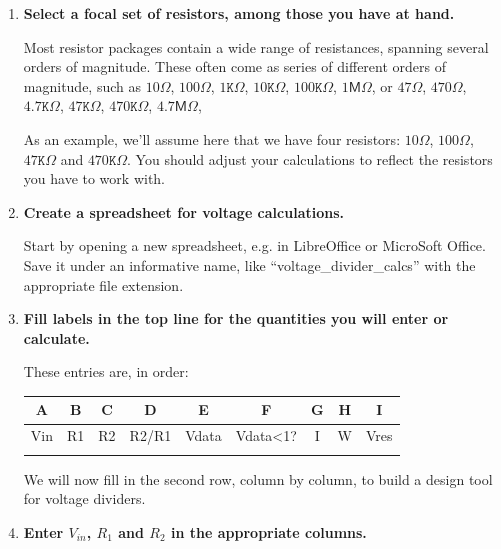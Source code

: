 \begin{enumerate}
	\item \textbf{Select a focal set of resistors, among those you have at hand.}
	
	Most resistor packages contain a wide range of resistances, spanning several orders of magnitude. 
	These often come as series of different orders of magnitude, such as $10 \Omega$, $100 \Omega$, $1\mathtt{K} \Omega$, $10\mathtt{K} \Omega$, $100\mathtt{K} \Omega$, $1 \mathsf{M} \Omega$, or $47 \Omega$, $470 \Omega$, $4.7\mathtt{K} \Omega$, $47\mathtt{K} \Omega$, $470\mathtt{K} \Omega$, $4.7 \mathsf{M} \Omega$, \etc
	
	\smallskip
	As an example, we'll assume here that we have four resistors: $10 \Omega$, $100 \Omega$, $47\mathtt{K} \Omega$ and $470\mathtt{K} \Omega$. 
	You should adjust your calculations to reflect the resistors you have to work with.
	
	\item \textbf{Create a spreadsheet for voltage calculations.}
	
	Start by opening a new spreadsheet, e.g. in LibreOffice or MicroSoft Office. 
	Save it under an informative name, like ``voltage\_divider\_calcs'' with the appropriate file extension.
	
	\item \textbf{Fill labels in the top line for the quantities you will enter or calculate.}
	
	These entries are, in order:
	\begin{table}[H]
	\centering \begin{small}
	\begin{tabular}{|c|c|c|c|c|c|c|c|c|}
		\hline 
		\textbf{A}  & \textbf{B} & \textbf{C} & \textbf{D} & \textbf{E} & \textbf{F} & \textbf{G} & \textbf{H} & \textbf{I} \\ 
		\hline 
		Vin  & R1 & R2 & R2/R1 & Vdata & Vdata<1? & I & W & Vres \\ 
		\hline 
		&  &  &  &  &  &  &  &  \\ 
		\hline 
	\end{tabular} 
	\end{small}
	\end{table}
	We will now fill in the second row, column by column, to build a design tool for voltage dividers.

	\item \textbf{Enter $V_{in}$, $R_1$ and $R_2$ in the appropriate columns.}


\end{enumerate}
